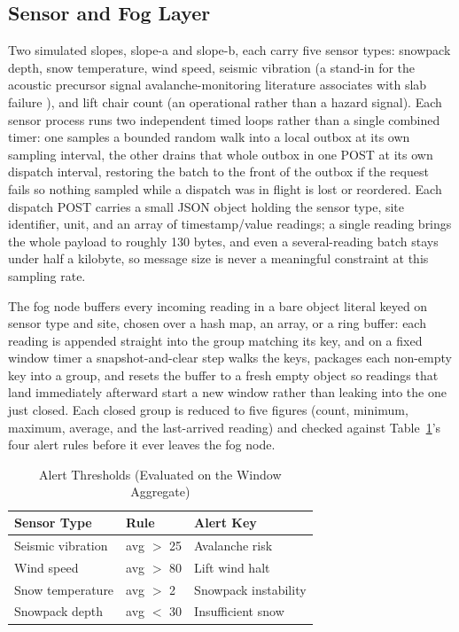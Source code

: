 \documentclass[conference]{IEEEtran}
\begin{document}
\subsection{Sensor and Fog Layer}
Two simulated slopes, slope-a and slope-b, each carry five sensor types: snowpack depth, snow temperature, wind speed, seismic vibration (a stand-in for the acoustic precursor signal avalanche-monitoring literature associates with slab failure \cite{ref3}), and lift chair count (an operational rather than a hazard signal). Each sensor process runs two independent timed loops rather than a single combined timer: one samples a bounded random walk into a local outbox at its own sampling interval, the other drains that whole outbox in one POST at its own dispatch interval, restoring the batch to the front of the outbox if the request fails so nothing sampled while a dispatch was in flight is lost or reordered. Each dispatch POST carries a small JSON object holding the sensor type, site identifier, unit, and an array of timestamp/value readings; a single reading brings the whole payload to roughly 130 bytes, and even a several-reading batch stays under half a kilobyte, so message size is never a meaningful constraint at this sampling rate.

The fog node buffers every incoming reading in a bare object literal keyed on sensor type and site, chosen over a hash map, an array, or a ring buffer: each reading is appended straight into the group matching its key, and on a fixed window timer a snapshot-and-clear step walks the keys, packages each non-empty key into a group, and resets the buffer to a fresh empty object so readings that land immediately afterward start a new window rather than leaking into the one just closed. Each closed group is reduced to five figures (count, minimum, maximum, average, and the last-arrived reading) and checked against Table~\ref{tab:thresholds}'s four alert rules before it ever leaves the fog node.

\begin{table}[!t]
\caption{Alert Thresholds (Evaluated on the Window Aggregate)}
\label{tab:thresholds}
\centering
\scriptsize
\setlength{\tabcolsep}{3pt}
\begin{tabular}{|l|l|l|}
\hline
\textbf{Sensor Type} & \textbf{Rule} & \textbf{Alert Key} \\
\hline
Seismic vibration & avg $>$ 25 & Avalanche risk \\
\hline
Wind speed & avg $>$ 80 & Lift wind halt \\
\hline
Snow temperature & avg $>$ 2 & Snowpack instability \\
\hline
Snowpack depth & avg $<$ 30 & Insufficient snow \\
\hline
\end{tabular}
\end{table}
\end{document}
